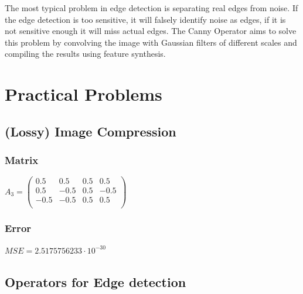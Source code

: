 \documentclass[a4paper,12pt]{article}
\begin{document}
	\subsubsection{}
	The most typical problem in edge detection is separating real edges from noise. If the edge detection is too sensitive, it will falsely identify noise as edges, if it is not sensitive enough it will miss actual edges. The Canny Operator aims to solve this problem by convolving the image with Gaussian filters of different scales and compiling the results using feature synthesis. 
	
	\section{Practical Problems}
	\subsection{(Lossy) Image Compression}
	\subsubsection{Matrix}
	$A_3 =
	\begin{pmatrix}
	0.5 & 0.5 & 0.5 & 0.5\\
	0.5 & -0.5 & 0.5 & -0.5\\
	-0.5 & -0.5 & 0.5 & 0.5\\
    \end{pmatrix}		
	$
	\subsubsection{Error}
	$MSE = 2.5175756233 \cdot 10^{-30}$
	
	\subsection{Operators for Edge detection}
	
	\newlength{\colwidth}
	\newlength{\colsep}
	\setlength{\colsep}{8mm}
	\setlength{\colwidth}{\dimexpr.25\textwidth-.75\colsep}
	
\end{document}
